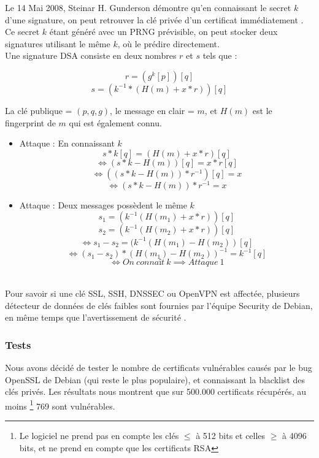 			Le 14 Mai 2008, Steinar H. Gunderson démontre qu'en connaissant le secret $k$ d'une signature, on peut retrouver la clé privée d'un certificat immédiatement \cite{gunderson2008}. Ce secret $k$ étant généré avec un PRNG prévisible, on peut stocker deux signatures utilisant le même $k$, où le prédire directement.\\
		
			Une signature DSA consiste en deux nombres $r$ et $s$ tels que :
			
			$$r = (g^k [p]) [q]$$
			$$s = (k^{-1} * (H(m) + x * r)) [q]$$
		
			La clé publique = $(p, q, g)$, le message en clair = $m$, et $H(m)$ est le fingerprint de $m$ qui est également connu.
		
			\begin{itemize}
			\item Attaque  : En connaissant $k$
			$$s * k [q] = (H(m) + x*r) [q]$$
			$$\iff (s * k - H(m)) [q] = x*r [q]$$
			$$\iff ((s*k - H(m))*r^{-1})[q] = x$$
			$$\iff (s*k - H(m))*r^{-1} = x$$
	
			\item Attaque  : Deux messages possèdent le même $k$
			$$s_1 = (k^{-1} (H(m_1) + x*r)) [q]$$
			$$s_2 = (k^{-1} (H(m_2) + x*r)) [q]$$
			$$\iff s_1 - s_2 = (k^{-1} (H(m_1) - H(m_2)) [q]$$
			$$\iff (s_1 - s_2)*(H(m_1) - H(m_2))^{-1} = k^{-1} [q]$$
			$$\iff On\ connaît\ k \implies Attaque\ 1$$\\
			\end{itemize}
	
			Pour savoir si une clé SSL, SSH, DNSSEC ou OpenVPN est affectée, plusieurs détecteur de données \cite{dowkd.pl} \cite{openssl-blacklist} de clés faibles sont fournies par l'équipe Security de Debian, en même temps que l'avertissement de sécurité \cite{debian2008bug}.\\ 
	
		\subsubsection{Tests}
	
			Nous avons décidé de tester le nombre de certificats vulnérables causés 	par le bug OpenSSL de Debian (qui reste le plus populaire), et connaissant la blacklist des clés privés. Les résultats nous montrent que sur 500.000 certificats récupérés, au moins \footnote{Le logiciel ne prend pas en compte les clés $\leq$ à 512 bits et celles $\geq$ à 4096 bits, et ne prend en compte que les certificats RSA} 769 sont vulnérables.\\
			
